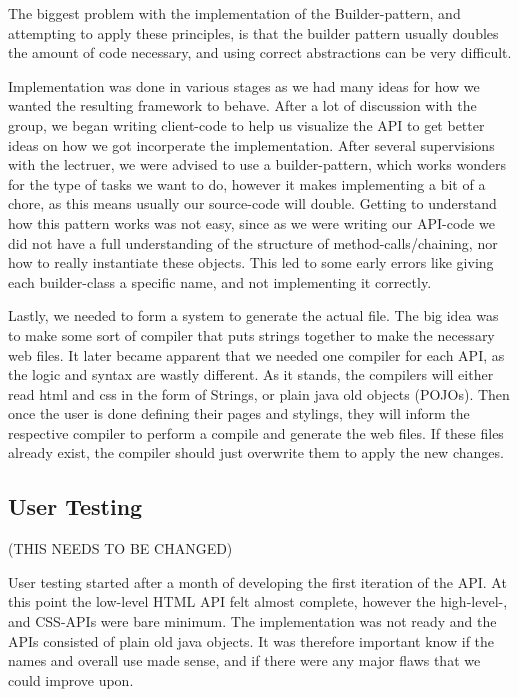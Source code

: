 \documentclass[12pt]{article}
\begin{document}
        The biggest problem with the implementation of the Builder-pattern, and attempting to apply these principles, is that the builder pattern usually doubles the amount of code necessary, and using correct abstractions can be very difficult.

        Implementation was done in various stages as we had many ideas for how we wanted the resulting framework to behave. After a lot of discussion with the group, we began writing client-code to help us visualize the API to get better ideas on how we got incorperate the implementation. After several supervisions with the lectruer, we were advised to use a builder-pattern, which works wonders for the type of tasks we want to do, however it makes implementing a bit of a chore, as this means usually our source-code will double. Getting to understand how this pattern works was not easy, since as we were writing our API-code we did not have a full understanding of the structure of method-calls/chaining, nor how to really instantiate these objects. This led to some early errors like giving each builder-class a specific name, and not implementing it correctly.
    
    
        Lastly, we needed to form a system to generate the actual file. The big idea was to make some sort of compiler that puts strings together to make the necessary web files. It later became apparent that we needed one compiler for each API, as the logic and syntax are wastly different. As it stands, the compilers will either read html and css in the form of Strings, or plain java old objects (POJOs). Then once the user is done defining their pages and stylings, they will inform the respective compiler to perform a compile and generate the web files. If these files already exist, the compiler should just overwrite them to apply the new changes.


    \subsection{User Testing}

    (THIS NEEDS TO BE CHANGED)

    User testing started after a month of developing the first iteration of the API. At this point the low-level HTML API felt almost complete, however the high-level-, and CSS-APIs were bare minimum. The implementation was not ready and the APIs consisted of plain old java objects. It was therefore important know if the names and overall use made sense, and if there were any major flaws that we could improve upon.
\end{document}
